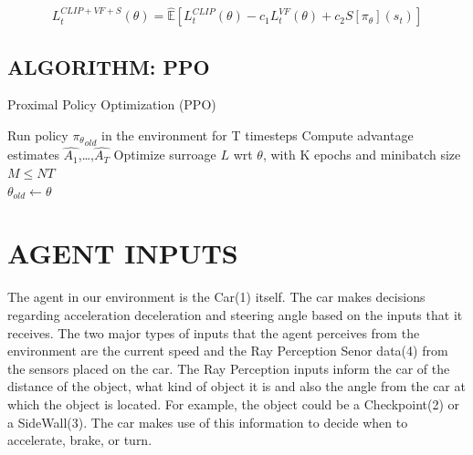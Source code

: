 
\begin{equation}
    L_{t}^{CLIP+VF+S}(\theta) = \hat{\mathbb{E}}[L_{t}^{CLIP}(\theta) - c_{1}L_{t}^{VF}(\theta) + c_{2}S[\pi_{\theta}](s_{t})] 
\end{equation}




\subsection{ALGORITHM: PPO} \label{ch4-ppo-alg}



\begin{algorithm}[H]
\caption{Proximal Policy Optimization (PPO)}\label{alg:ppo}
\begin{algorithmic}
\State Run policy ${\pi_{\theta}}_{old}$ in the environment for T timesteps
\State Compute advantage estimates $\hat{A_{1}}$,\ldots,$\hat{A_{T}}$
\EndFor
\State Optimize surroage $L$ wrt $\theta$, with K epochs and minibatch size $M \leq NT$\\
\State $\theta_{old} \gets \theta$
\EndFor
\end{algorithmic}
\end{algorithm}


\section{AGENT INPUTS} \label{ch4inp}

The agent in our environment is the Car(1) itself. The car makes decisions regarding acceleration deceleration and steering angle based on the inputs that it receives. The two major types of inputs that the agent perceives from the environment are the current speed and the Ray Perception Senor data(4) from the sensors placed on the car. The Ray Perception inputs inform the car of the distance of the object, what kind of object it is and also the angle from the car at which the object is located. For example, the object could be a Checkpoint(2) or a SideWall(3). The car makes use of this information to decide when to accelerate, brake, or turn.

